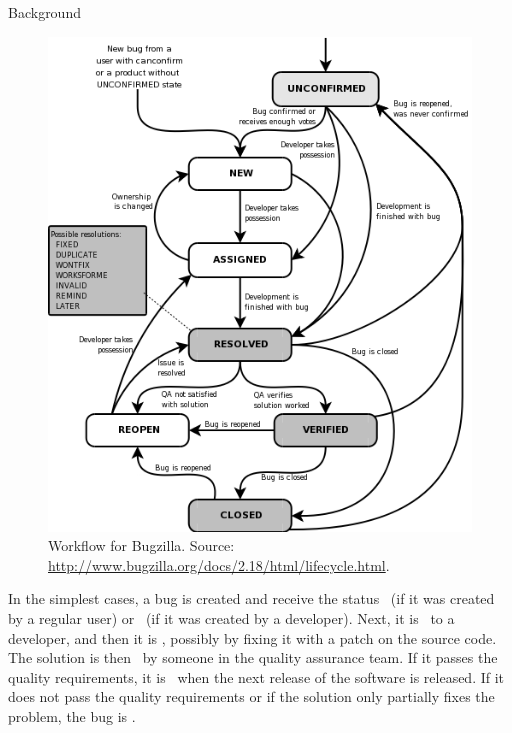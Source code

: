 \begin{section}{Background}
\begin{figure}[ht]
	\centering
		\includegraphics[scale=0.4]{bugzilla.png}
	\caption{Workflow for Bugzilla. Source: \url{http://www.bugzilla.org/docs/2.18/html/lifecycle.html}.}
	\label{fig:bugzilla}
\end{figure}

In the simplest cases, a bug is created and receive the status \UNCONFIRMED\ (if it was created by a regular user) or \NEW\ (if it was created by a developer). Next, it is \ASSIGNED\ to a developer, and then it is \RESOLVED, possibly by fixing it with a patch on the source code. The solution is then \VERIFIED\ by someone in the quality assurance team. If it passes the quality requirements, it is \CLOSED\ when the next release of the software is released. If it does not pass the quality requirements or if the solution only partially fixes the problem, the bug is \REOPENED.




\end{section}
